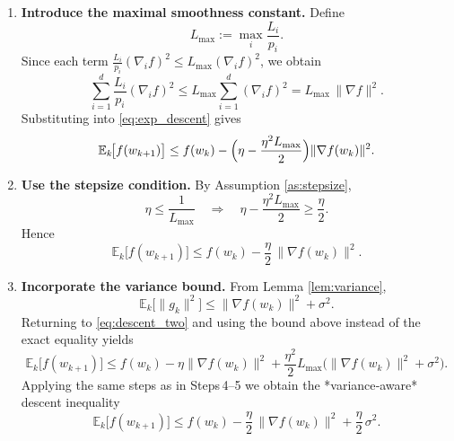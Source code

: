\documentclass{article}
\begin{document}
\begin{enumerate}
    \item[Step 4.] \textbf{Introduce the maximal smoothness constant.}
    Define
    \[
        L_{\max}:=\max_{i}\frac{L_i}{p_i}.
    \]
    Since each term $\frac{L_i}{p_i}(\nabla_i f)^2\le L_{\max}(\nabla_i f)^2$, we obtain
    \[
        \sum_{i=1}^{d}\frac{L_i}{p_i}(\nabla_i f)^2
        \le L_{\max}\sum_{i=1}^{d}(\nabla_i f)^2
        = L_{\max}\,\|\nabla f\|^{2}.
    \]
    Substituting into \eqref{eq:exp_descent} gives
    \begin{equation}
        \mathbb{E}_k\!\bigl[f(w_{k+1})\bigr]
        \le f(w_k)
           -\Bigl(\eta-\frac{\eta^{2}L_{\max}}{2}\Bigr)\|\nabla f(w_k)\|^{2}.
        \label{eq:descent_final}
    \end{equation}

    \item[Step 5.] \textbf{Use the stepsize condition.}
    By Assumption \ref{as:stepsize},
    \[
        \eta\le\frac{1}{L_{\max}}\quad\Longrightarrow\quad
        \eta-\frac{\eta^{2}L_{\max}}{2}\ge\frac{\eta}{2}.
    \]
    Hence
    \begin{equation}
        \mathbb{E}_k\!\bigl[f(w_{k+1})\bigr]
        \le f(w_k)-\frac{\eta}{2}\,\|\nabla f(w_k)\|^{2}.
        \label{eq:descent_simplified}
    \end{equation}

    \item[Step 6.] \textbf{Incorporate the variance bound.}
    From Lemma \ref{lem:variance},
    \[
        \mathbb{E}_k\!\bigl[\|g_k\|^{2}\bigr]
        \le \|\nabla f(w_k)\|^{2}+\sigma^{2}.
    \]
    Returning to \eqref{eq:descent_two} and using the bound above instead of the exact equality yields
    \[
        \mathbb{E}_k\!\bigl[f(w_{k+1})\bigr]
        \le f(w_k)
           -\eta\|\nabla f(w_k)\|^{2}
           +\frac{\eta^{2}}{2}L_{\max}\bigl(\|\nabla f(w_k)\|^{2}+\sigma^{2}\bigr).
    \]
    Applying the same steps as in Steps 4–5 we obtain the *variance‑aware* descent inequality
    \begin{equation}
        \mathbb{E}_k\!\bigl[f(w_{k+1})\bigr]
        \le f(w_k)-\frac{\eta}{2}\,\|\nabla f(w_k)\|^{2}
           +\frac{\eta}{2}\,\sigma^{2}.
        \label{eq:descent_variance}
    \end{equation}


\end{enumerate}
\end{document}
